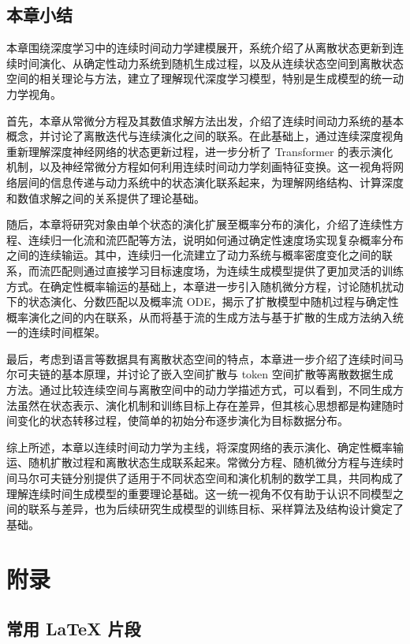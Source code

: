 \documentclass[UTF8,a4paper,zihao=-4,oneside,openany]{ctexbook}
\begin{document}
\section{本章小结}

本章围绕深度学习中的连续时间动力学建模展开，系统介绍了从离散状态更新到连续时间演化、从确定性动力系统到随机生成过程，以及从连续状态空间到离散状态空间的相关理论与方法，建立了理解现代深度学习模型，特别是生成模型的统一动力学视角。

首先，本章从常微分方程及其数值求解方法出发，介绍了连续时间动力系统的基本概念，并讨论了离散迭代与连续演化之间的联系。在此基础上，通过连续深度视角重新理解深度神经网络的状态更新过程，进一步分析了 Transformer 的表示演化机制，以及神经常微分方程如何利用连续时间动力学刻画特征变换。这一视角将网络层间的信息传递与动力系统中的状态演化联系起来，为理解网络结构、计算深度和数值求解之间的关系提供了理论基础。

随后，本章将研究对象由单个状态的演化扩展至概率分布的演化，介绍了连续性方程、连续归一化流和流匹配等方法，说明如何通过确定性速度场实现复杂概率分布之间的连续输运。其中，连续归一化流建立了动力系统与概率密度变化之间的联系，而流匹配则通过直接学习目标速度场，为连续生成模型提供了更加灵活的训练方式。在确定性概率输运的基础上，本章进一步引入随机微分方程，讨论随机扰动下的状态演化、分数匹配以及概率流 ODE，揭示了扩散模型中随机过程与确定性概率演化之间的内在联系，从而将基于流的生成方法与基于扩散的生成方法纳入统一的连续时间框架。

最后，考虑到语言等数据具有离散状态空间的特点，本章进一步介绍了连续时间马尔可夫链的基本原理，并讨论了嵌入空间扩散与 token 空间扩散等离散数据生成方法。通过比较连续空间与离散空间中的动力学描述方式，可以看到，不同生成方法虽然在状态表示、演化机制和训练目标上存在差异，但其核心思想都是构建随时间变化的状态转移过程，使简单的初始分布逐步演化为目标数据分布。

综上所述，本章以连续时间动力学为主线，将深度网络的表示演化、确定性概率输运、随机扩散过程和离散状态生成联系起来。常微分方程、随机微分方程与连续时间马尔可夫链分别提供了适用于不同状态空间和演化机制的数学工具，共同构成了理解连续时间生成模型的重要理论基础。这一统一视角不仅有助于认识不同模型之间的联系与差异，也为后续研究生成模型的训练目标、采样算法及结构设计奠定了基础。
\appendix
\chapter{附录}

\section{常用 LaTeX 片段}
\end{document}
